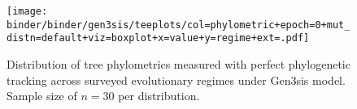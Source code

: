 \begin{figure*}
  \centering
    \texttt{[image: binder/binder/gen3sis/teeplots/col=phylometric+epoch=0+mut\_distn=default+viz=boxplot+x=value+y=regime+ext=.pdf]}
  \caption{%
    Distribution of tree phylometrics measured with perfect phylogenetic tracking across surveyed evolutionary regimes under Gen3sis model.
    Sample size of $n=30$ per distribution.
  }
  \label{fig:perfect-tree-phylometrics-boxplot-gen3sis}
\end{figure*}
